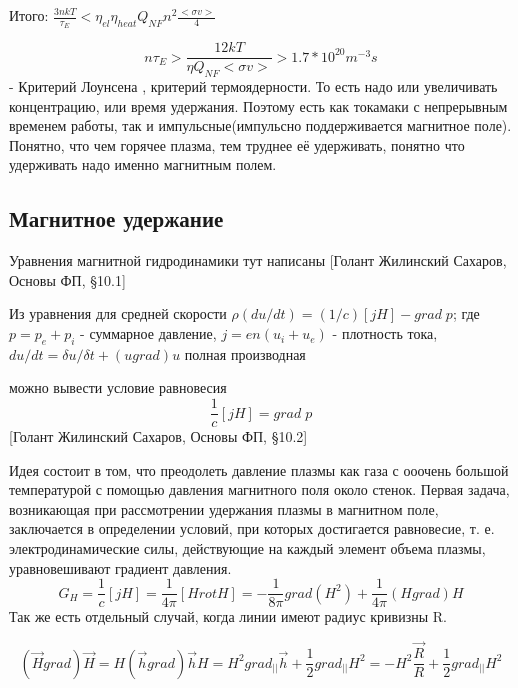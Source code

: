 \documentclass[10pt, a4paper]{article}
\begin{document}
Итого: $ \frac{3nkT}{\tau_E} < \eta_{el} \eta_{heat} Q_{NF} n^{2} \frac{<\sigma v>}{4}$

\begin{equation}
	\label{eq.Disp14.1.1}
	n \tau_E > \frac{12 kT}{\eta Q_{NF} <\sigma v>} > 1.7*10^{20} m^{-3} s
\end{equation}
 - Критерий Лоунсена , критерий термоядерности. То есть надо или увеличивать концентрацию, или время удержания. Поэтому есть как токамаки с непрерывным временем работы, так и импульсные(импульсно поддерживается магнитное поле).
Понятно, что чем горячее плазма, тем труднее её удерживать, понятно что удерживать надо именно магнитным полем.

\subsection{Магнитное удержание}
\label{14.1}

Уравнения магнитной гидродинамики тут написаны [Голант Жилинский Сахаров, Основы ФП,  §10.1]

Из уравнения для средней скорости $\rho (du/dt)=(1/c)[j H]-grad\;p$; где $p=p_e+p_i$ - суммарное давление, $j=en(u_i+u_e)$ - плотность тока, $ du/dt=\delta u / \delta t + (u grad)u$ полная производная

можно вывести условие равновесия
\begin{equation}
	\label{eq.Disp14.1.2}
	\frac{1}{c}[j H]=grad\;p
\end{equation}
[Голант Жилинский Сахаров, Основы ФП,  §10.2]


Идея состоит в том, что преодолеть давление плазмы как газа с ооочень большой температурой с помощью давления магнитного поля около стенок.
Первая задача, возникающая при рассмотрении удержания плазмы в магнитном поле, заключается в определении условий, при которых достигается равновесие, т. е. электродинамические силы, действующие на каждый элемент объема плазмы, уравновешивают градиент давления.
\begin{equation}
	\label{eq.Disp14.1.3}
	G_H=\frac{1}{c} [j H]=\frac{1}{4 \pi} [H rotH]=-\frac{1}{8 \pi} grad(H^{2})+\frac{1}{4 \pi} (H grad) H
\end{equation}
Так же есть отдельный случай, когда линии имеют радиус кривизны R.

\begin{equation}
	\label{eq.Disp14.1.4}
(\vec H grad)\vec H=H(\vec h grad)\vec h H=H^{2} grad_{||}\vec h + \frac{1}{2} grad_{||} H^{2}=-H^{2} \frac{\vec R}{R}+\frac{1}{2} grad_{||} H^{2}
\end{equation}
\end{document}

